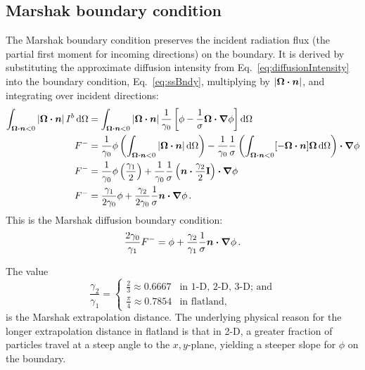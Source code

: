 \subsection{Marshak boundary condition}
The Marshak boundary condition \cite{Mar1947} preserves the incident radiation
flux (the partial first moment for incoming directions) on the boundary. It is
derived by substituting the approximate diffusion
intensity from Eq.~\eqref{eq:diffusionIntensity} into the boundary condition,
Eq.~\eqref{eq:ssBndy}, multiplying by $\left| \bm{\Omega}\bm{\cdot} \bm{n} \right|$, and integrating over
incident directions:
\begin{align*}
\int_{\bm{\Omega}\bm{\cdot} \bm{n} < 0 } \left| \bm{\Omega}\bm{\cdot} \bm{n} \right|
I^b \mathop{}\!\mathrm{d}\Omega
 &= 
\int_{\bm{\Omega}\bm{\cdot} \bm{n} < 0 } \left| \bm{\Omega}\bm{\cdot} \bm{n} \right| 
 \frac{1}{\gamma_0} \left[ \phi - \frac{1}{\sigma}
  \bm{\Omega} \bm{\cdot} \bm{\nabla} \phi \right]
  \mathop{}\!\mathrm{d}\Omega
\\
F^{-}
&= 
\frac{1}{\gamma_0} \phi \left( \int_{\bm{\Omega}\bm{\cdot} \bm{n} < 0 }
\left| \bm{\Omega}\bm{\cdot} \bm{n} \right| \mathop{}\!\mathrm{d}\Omega \right) 
  - \frac{1}{\gamma_0}\frac{1}{\sigma}
  \left( \int_{\bm{\Omega}\bm{\cdot} \bm{n} < 0 } [-\bm{\Omega}\bm{\cdot} \bm{n}]
  \bm{\Omega} \mathop{}\!\mathrm{d}\Omega  \right) \bm{\cdot} \bm{\nabla} \phi
\\
F^{-}
&=
\frac{1}{\gamma_0} \phi \left( \frac{\gamma_1}{2} \right) 
  + \frac{1}{\gamma_0}\frac{1}{\sigma} \left( \bm{n} \bm{\cdot}
  \frac{\gamma_2}{2} \mathbf{I} \right)
  \bm{\cdot} \bm{\nabla} \phi
\\
F^{-}
&=
\frac{\gamma_1}{2\gamma_0} \phi
+ \frac{\gamma_2}{2\gamma_0}\frac{1}{\sigma} \bm{n} \bm{\cdot} \bm{\nabla} \phi\,.
\end{align*}
This is the Marshak diffusion boundary condition:
\begin{equation} \label{eq:marshak}
\frac{2\gamma_0}{\gamma_1} F^{-}
=
\phi + \frac{\gamma_2}{\gamma_1}\frac{1}{\sigma} \bm{n} \bm{\cdot} \bm{\nabla} \phi\,.
\end{equation}

The value
\begin{equation*}
  \frac{\gamma_2}{\gamma_1}
  =
  \begin{cases}
    \frac{2}{3} \approx 0.6667 & \text{in 1-D, 2-D, 3-D; and} \\
    \frac{\pi}{4} \approx 0.7854 & \text{in flatland,}
  \end{cases}
\end{equation*}
is the Marshak extrapolation distance.
The underlying physical reason for the longer extrapolation distance in flatland
is that in 2-D, a greater fraction of particles travel at a steep angle to the
$x,y$-plane, yielding a steeper slope for $\phi$ on the boundary.

